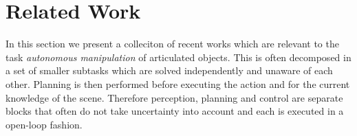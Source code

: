 \section{Related Work}
\label{sec:Related Work}


In this section we present a colleciton of recent works which are relevant to the task \emph{autonomous manipulation} of articulated objects. This is often decomposed in a set of smaller subtasks which are solved independently and unaware of each other. Planning is then performed before executing the action and for the current knowledge of the scene. Therefore perception, planning and control are separate blocks that often do not take uncertainty into account and each is executed in a open-loop fashion.

